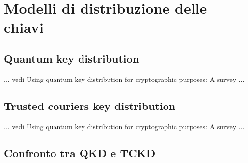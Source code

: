 \chapter{Modelli di distribuzione delle chiavi}
\label{chap:modelli_distribuzione_chiavi}

\section{Quantum key distribution}
... vedi Using quantum key distribution for cryptographic purposes: A survey ...

\section{Trusted couriers key distribution}
... vedi Using quantum key distribution for cryptographic purposes: A survey ...

\section{Confronto tra QKD e TCKD}
